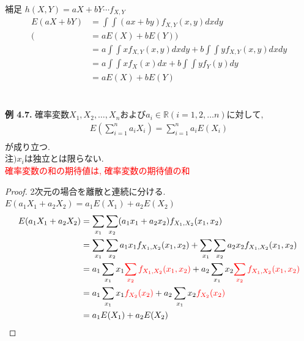\documentclass[dvipdfmx,10pt, a4j]{jarticle}
\theoremstyle{definition}
\begin{document}
\begin{itembox}[l]{補足}
    $h(X, Y) = aX + bY \cdots f_{X, Y}$\\
    \begin{align*}
        E(aX + bY) &= \int\int(ax + by)f_{X, Y}(x, y)dxdy\\
        (&= aE(X) + bE(Y))\\
        &= a\int\int xf_{X, Y}(x, y)dxdy + b\int\int yf_{X, Y}(x, y)dxdy\\
        &= a\int\int xf_{X}(x)dx + b\int\int yf_{Y}(y)dy\\
        &= aE(X) + bE(Y)\\
    \end{align*}
\end{itembox}\\
\noindent
\textbf{例 4.7.} $確率変数 X_1, X_2, \dots, X_n および a_i \in \mathbb{R} (i = 1,2, \dots n)に対して,$\\
\begin{align*}
    E\left(\sum_{i=1}^{n}a_i X_i\right) = \sum_{i=1}^{n}a_i E(X_i)\\
\end{align*}
が成り立つ.\\
$注) x_iは独立とは限らない.$\\
\textcolor{red}{確率変数の和の期待値は, 確率変数の期待値の和}\\
\begin{proof}
    2次元の場合を離散と連続に分ける.\\
    $E(a_1 X_1 + a_2 X_2) = a_1 E(X_1) + a_2 E(X_2)$\\
    \begin{align*}
        E(a_1 X_1 + a_2 X_2) &= \sum_{x_1}\sum_{x_2}(a_1x_1 + a_2x_2)f_{X_1, X_2}(x_1, x_2)\\
        &= \sum_{x_1}\sum_{x_2}a_1x_1f_{X_1, X_2}(x_1, x_2) + \sum_{x_1}\sum_{x_2}a_2x_2f_{X_1, X_2}(x_1, x_2)\\
        &= a_1\sum_{x_1}x_1\textcolor{red}{\sum_{x_2}f_{X_1, X_2}(x_1, x_2)} + a_2\sum_{x_1}x_2\textcolor{red}{\sum_{x_2}f_{X_1, X_2}(x_1, x_2)}\\
        &= a_1\sum_{x_1}x_1\textcolor{red}{f_{X_2}(x_2)} + a_2\sum_{x_1}x_2\textcolor{red}{f_{X_2}(x_2)}\\
        &= a_1 E(X_1) + a_2 E(X_2)\\
    \end{align*}
\end{proof}
\end{document}
